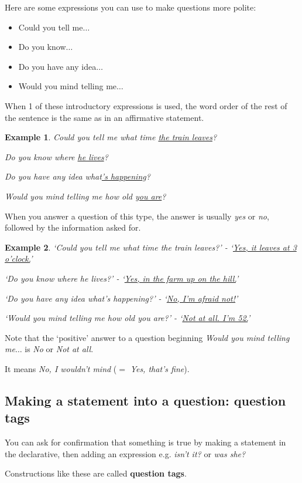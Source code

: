 \documentclass[oneside]{book}
\numberwithin{equation}{section}
\newtheorem{example}{Example}[section]
\begin{document}
%
Here are some expressions you can use to make questions more polite:
\begin{itemize}
    \item Could you tell me$\ldots$
    \item Do you know$\ldots$
    \item Do you have any idea$\ldots$
    \item Would you mind telling me$\ldots$
\end{itemize}
When 1 of these introductory expressions is used, the word order of the rest of the sentence is the same as in an affirmative statement.
\begin{example}
    Could you tell me what time \underline{the train leaves}?
    
    Do you know where \underline{he lives}?
    
    Do you have any idea what\underline{'s happening}?
    
    Would you mind telling me how old \underline{you are}?
\end{example}
When you answer a question of this type, the answer is usually \textit{yes} or \textit{no}, followed by the information asked for.
\begin{example}
    `Could you tell me what time the train leaves?' - `\underline{Yes, it leaves at 3 o'clock.}'
    
    `Do you know where he lives?' - `\underline{Yes, in the farm up on the hill.}'
    
    `Do you have any idea what's happening?' - `\underline{No, I'm afraid not!}'
    
    `Would you mind telling me how old you are?' - `\underline{Not at all. I'm 52.}'
\end{example}
Note that the `positive' answer to a question beginning \textit{Would you mind telling me$\ldots$} is \textit{No} or \textit{Not at all}.

It means \textit{No, I wouldn't mind} ($=$ \textit{Yes, that's fine}).

\subsection{Making a statement into a question: question tags}
\noindent{} You can ask for confirmation that something is true by making a statement in the declarative, then adding an expression e.g. \textit{isn't it?} or \textit{was she?}

Constructions like these are called \textbf{question tags}.
\end{document}
